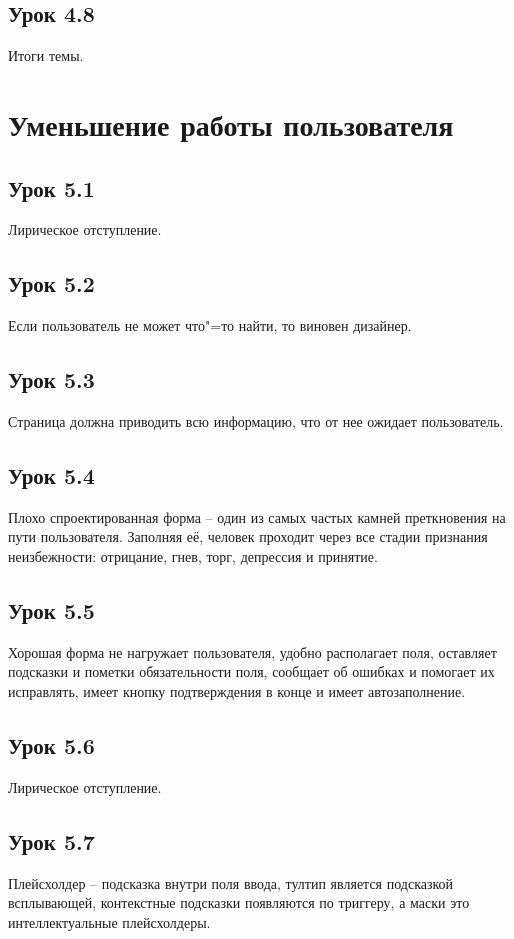 \documentclass[variant=practice]{bsuir}
\begin{document}
\subsection{Урок 4.8} Итоги темы.

\section{Уменьшение работы пользователя}

\subsection{Урок 5.1} Лирическое отступление.

\subsection{Урок 5.2} Если пользователь не может что"=то найти, то виновен
дизайнер.

\subsection{Урок 5.3} Страница должна приводить всю информацию, что от нее
ожидает пользователь.

\subsection{Урок 5.4} Плохо спроектированная форма -- один из самых частых
камней преткновения на пути пользователя. Заполняя её, человек проходит через
все стадии признания неизбежности: отрицание, гнев, торг, депрессия и принятие.

\subsection{Урок 5.5} Хорошая форма не нагружает пользователя, удобно
располагает поля, оставляет подсказки и пометки обязательности поля, сообщает об
ошибках и помогает их исправлять, имеет кнопку подтверждения в конце и имеет
автозаполнение.

\subsection{Урок 5.6} Лирическое отступление.

\subsection{Урок 5.7} Плейсхолдер -- подсказка внутри поля ввода, тултип
является подсказкой всплывающей, контекстные подсказки появляются по триггеру, а
маски это интеллектуальные плейсхолдеры.
\end{document}
